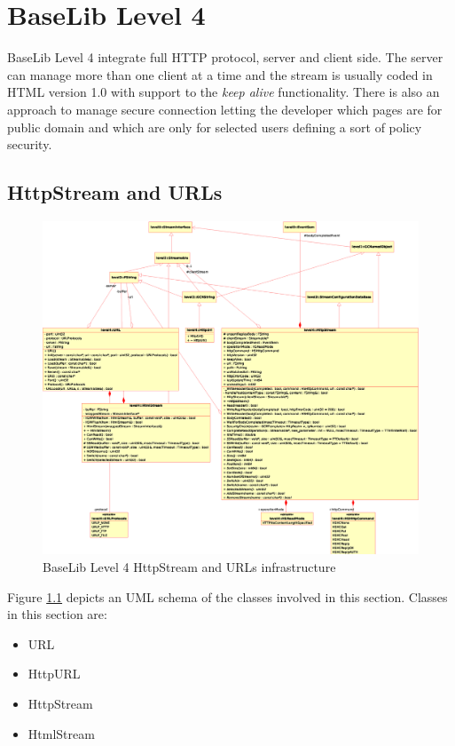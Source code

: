 \chapter{BaseLib Level 4}

BaseLib Level 4 integrate full HTTP protocol, server and client side. The server can manage more than one client at a time and the stream is usually coded in HTML version 1.0 with support to the \textit{keep alive} functionality. There is also an approach to manage secure connection letting the developer which pages are for public domain and which are only for selected users defining a sort of policy security.



\section{HttpStream and URLs}


\begin{figure}[h!]
 \begin{center}
  \includegraphics[width=\textwidth]{level4/level4-HttpStream.eps}
  \caption{BaseLib Level 4 HttpStream and URLs infrastructure}
  \label{f:level4:HttpStream}
 \end{center}
\end{figure}

Figure \ref{f:level4:HttpStream} depicts an UML schema of the classes involved in this section. Classes in this section are:
\begin{itemize}
 \item URL
 \item HttpURL

 \item HttpStream
 \item HtmlStream
\end{itemize}



